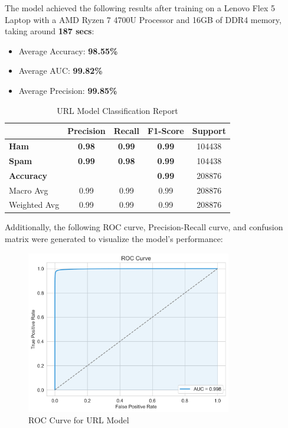 \documentclass{article}
\begin{document}
\noindent
The model achieved the following results after training on a Lenovo Flex 5 Laptop with a AMD Ryzen 7 4700U Processor and 16GB of DDR4 memory, taking around \textbf{187 secs}:

\begin{itemize}
    \item Average Accuracy: \textbf{98.55\%}
    \item Average AUC: \textbf{99.82\%}
    \item Average Precision: \textbf{99.85\%}
\end{itemize} 


\begin{table}[htbp]
    \centering
    \caption{URL Model Classification Report}
    \begin{tabular}{l c c c c}
    \toprule
     & \textbf{Precision} & \textbf{Recall} & \textbf{F1-Score} & Support \\
    \midrule
    \textbf{Ham} & \textbf{0.98} & \textbf{0.99} & \textbf{0.99} & 104438 \\
    \textbf{Spam} & \textbf{0.99} & \textbf{0.98} & \textbf{0.99} & 104438 \\
    \midrule
    \textbf{Accuracy} & & & \textbf{0.99} & 208876 \\
    Macro Avg & 0.99 & 0.99 & 0.99 & 208876 \\
    Weighted Avg & 0.99 & 0.99 & 0.99 & 208876 \\
    \bottomrule
    \end{tabular}
    \label{tab:classification_report}
\end{table}

\noindent
Additionally, the following ROC curve, Precision-Recall curve, and confusion matrix were generated to visualize the model's performance:


\begin{figure}[htbp]
    \centering
    \includegraphics[width=0.8\textwidth]{../analysis/url/roc_curve.png}
    \caption{ROC Curve for URL Model}
    \label{fig:roc_curve_1}
\end{figure}
\end{document}
